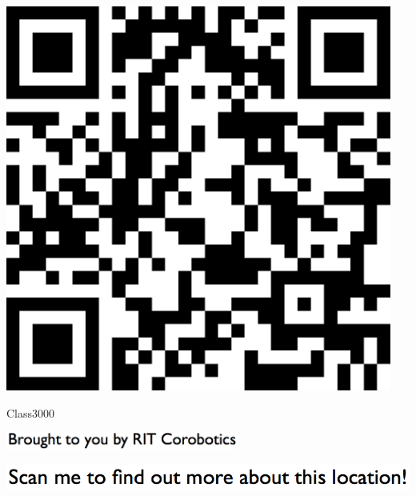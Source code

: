\documentclass[letterpaper]{article}
\begin{document}
 \begingroup 
 \centerline{\includegraphics[scale=1,width=5in,height=5in]{Class3000.png}} 
 \endgroup 
 \vspace*{\fill} 

 \hfill{\small Class3000} 

  \vspace{0.7in} 
 
 \centerline{\includegraphics[scale=1,width=3in]{text-bottom.png}} 
 
 \pagebreak 
{} 
 \vspace*{\fill} 
 
  \centerline{\includegraphics[scale=1,width=6in]{text-top.png}} 
 
 \vspace{0.5in} 
 
\end{document}
